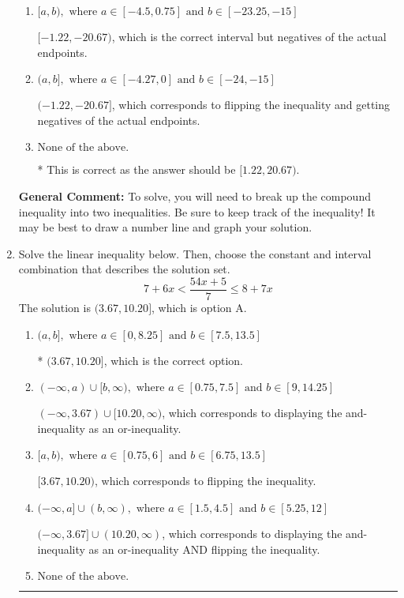 \documentclass{extbook}[14pt]
\newcommand{\litem}[1]{\item #1

\rule{\textwidth}{0.4pt}}
\begin{document}
\begin{enumerate}
{\begin{enumerate}[label=\Alph*.]
$(-\infty, -1.22) \cup [-20.67, \infty)$, which corresponds to displaying the and-inequality as an or-inequality AND flipping the inequality AND getting negatives of the actual endpoints.
\item \( [a, b), \text{ where } a \in [-4.5, 0.75] \text{ and } b \in [-23.25, -15] \)

$[-1.22, -20.67)$, which is the correct interval but negatives of the actual endpoints.
\item \( (a, b], \text{ where } a \in [-4.27, 0] \text{ and } b \in [-24, -15] \)

$(-1.22, -20.67]$, which corresponds to flipping the inequality and getting negatives of the actual endpoints.
\item \( \text{None of the above.} \)

* This is correct as the answer should be $[1.22, 20.67)$.
\end{enumerate}

\textbf{General Comment:} To solve, you will need to break up the compound inequality into two inequalities. Be sure to keep track of the inequality! It may be best to draw a number line and graph your solution.
}
\litem{
Solve the linear inequality below. Then, choose the constant and interval combination that describes the solution set.
\[ 7 + 6 x < \frac{54 x + 5}{7} \leq 8 + 7 x \]The solution is \( (3.67, 10.20] \), which is option A.\begin{enumerate}[label=\Alph*.]
\item \( (a, b], \text{ where } a \in [0, 8.25] \text{ and } b \in [7.5, 13.5] \)

* $(3.67, 10.20]$, which is the correct option.
\item \( (-\infty, a) \cup [b, \infty), \text{ where } a \in [0.75, 7.5] \text{ and } b \in [9, 14.25] \)

$(-\infty, 3.67) \cup [10.20, \infty)$, which corresponds to displaying the and-inequality as an or-inequality.
\item \( [a, b), \text{ where } a \in [0.75, 6] \text{ and } b \in [6.75, 13.5] \)

$[3.67, 10.20)$, which corresponds to flipping the inequality.
\item \( (-\infty, a] \cup (b, \infty), \text{ where } a \in [1.5, 4.5] \text{ and } b \in [5.25, 12] \)

$(-\infty, 3.67] \cup (10.20, \infty)$, which corresponds to displaying the and-inequality as an or-inequality AND flipping the inequality.
\item \( \text{None of the above.} \)



\end{enumerate}}
\end{enumerate}
\end{document}
